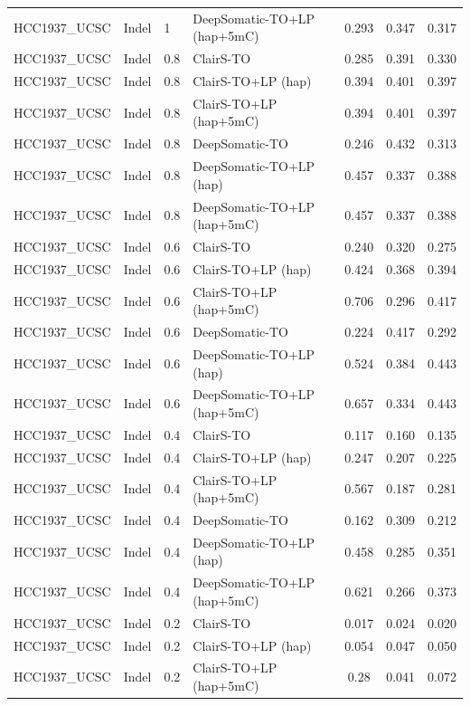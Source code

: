 \documentclass[pdflatex,sn-nature]{sn-jnl}
\begin{document}
{\begin{longtable}{@{}llllccc@{}}
  HCC1937\_UCSC & Indel & 1 & DeepSomatic-TO+LP (hap+5mC) & 0.293 & 0.347 & 0.317 \\
  HCC1937\_UCSC & Indel & 0.8 & ClairS-TO & 0.285 & 0.391 & 0.330 \\
  HCC1937\_UCSC & Indel & 0.8 & ClairS-TO+LP (hap) & 0.394 & 0.401 & 0.397 \\
  HCC1937\_UCSC & Indel & 0.8 & ClairS-TO+LP (hap+5mC) & 0.394 & 0.401 & 0.397 \\
  HCC1937\_UCSC & Indel & 0.8 & DeepSomatic-TO & 0.246 & 0.432 & 0.313 \\
  HCC1937\_UCSC & Indel & 0.8 & DeepSomatic-TO+LP (hap) & 0.457 & 0.337 & 0.388 \\
  HCC1937\_UCSC & Indel & 0.8 & DeepSomatic-TO+LP (hap+5mC) & 0.457 & 0.337 & 0.388 \\
  HCC1937\_UCSC & Indel & 0.6 & ClairS-TO & 0.240 & 0.320 & 0.275 \\
  HCC1937\_UCSC & Indel & 0.6 & ClairS-TO+LP (hap) & 0.424 & 0.368 & 0.394 \\
  HCC1937\_UCSC & Indel & 0.6 & ClairS-TO+LP (hap+5mC) & 0.706 & 0.296 & 0.417 \\
  HCC1937\_UCSC & Indel & 0.6 & DeepSomatic-TO & 0.224 & 0.417 & 0.292 \\
  HCC1937\_UCSC & Indel & 0.6 & DeepSomatic-TO+LP (hap) & 0.524 & 0.384 & 0.443 \\
  HCC1937\_UCSC & Indel & 0.6 & DeepSomatic-TO+LP (hap+5mC) & 0.657 & 0.334 & 0.443 \\
  HCC1937\_UCSC & Indel & 0.4 & ClairS-TO & 0.117 & 0.160 & 0.135 \\
  HCC1937\_UCSC & Indel & 0.4 & ClairS-TO+LP (hap) & 0.247 & 0.207 & 0.225 \\
  HCC1937\_UCSC & Indel & 0.4 & ClairS-TO+LP (hap+5mC) & 0.567 & 0.187 & 0.281 \\
  HCC1937\_UCSC & Indel & 0.4 & DeepSomatic-TO & 0.162 & 0.309 & 0.212 \\
  HCC1937\_UCSC & Indel & 0.4 & DeepSomatic-TO+LP (hap) & 0.458 & 0.285 & 0.351 \\
  HCC1937\_UCSC & Indel & 0.4 & DeepSomatic-TO+LP (hap+5mC) & 0.621 & 0.266 & 0.373 \\
  HCC1937\_UCSC & Indel & 0.2 & ClairS-TO & 0.017 & 0.024 & 0.020 \\
  HCC1937\_UCSC & Indel & 0.2 & ClairS-TO+LP (hap) & 0.054 & 0.047 & 0.050 \\
  HCC1937\_UCSC & Indel & 0.2 & ClairS-TO+LP (hap+5mC) & 0.28 & 0.041 & 0.072 \\

\end{longtable}}
\end{document}
